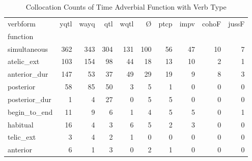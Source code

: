 \begin{table}[htbp!]
\centering
\caption{Collocation Counts of Time Adverbial Function with Verb Type}
\label{table:verbfunct_ct}
\begin{tabular}{lrrrrrrrrr}
\toprule
verbform &  yqtl &  wayq &  qtl &  wqtl &    Ø &  ptcp &  impv &  cohoF &  jussF \\
function      &       &       &      &       &      &       &       &        &        \\
\midrule
simultaneous  &   362 &   343 &  304 &   131 &  100 &    56 &    47 &     10 &      7 \\
atelic\_ext    &   103 &   154 &   98 &    44 &   18 &    13 &    10 &      2 &      1 \\
anterior\_dur  &   147 &    53 &   37 &    49 &   29 &    19 &     9 &      8 &      3 \\
posterior     &    58 &    85 &   50 &     3 &    5 &     1 &     0 &      0 &      0 \\
posterior\_dur &     1 &     4 &   27 &     0 &    5 &     5 &     0 &      0 &      0 \\
begin\_to\_end  &    11 &     9 &    6 &     1 &    4 &     5 &     5 &      0 &      1 \\
habitual      &    16 &     4 &    3 &     6 &    5 &     2 &     3 &      0 &      0 \\
telic\_ext     &     3 &     4 &    2 &     1 &    0 &     0 &     0 &      0 &      0 \\
anterior      &     6 &     1 &    3 &     0 &    2 &     1 &     0 &      0 &      0 \\
\bottomrule
\end{tabular}
\end{table}
